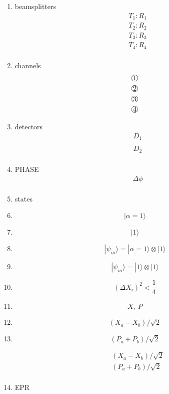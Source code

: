 \documentclass[12pt]{article}
\begin{document}
\begin{enumerate}
\item beamsplitters
\begin{align*} 
&  T_{1}:R_{1} \\
&  T_{2}:R_{2} \\
&  T_{3}:R_{3} \\
&  T_{4}:R_{4} \\
\end{align*}

\item channels
\begin{align*} 
&  \raisebox{.5pt}{\textcircled{\raisebox{-.9pt} {1}}}\\
&  \raisebox{.5pt}{\textcircled{\raisebox{-.9pt} {2}}}\\
&  \raisebox{.5pt}{\textcircled{\raisebox{-.9pt} {3}}}\\
&  \raisebox{.5pt}{\textcircled{\raisebox{-.9pt} {4}}}\\
\end{align*}


\item detectors
\begin{align*} 
&  D_{1} \\
\\
&  D_{2} \\
\end{align*}


\item PHASE
\begin{align*} 
&  \Delta \phi   \\
\end{align*}

\item states
\item $$ |\alpha = 1\rangle  $$

\item $$ |1\rangle   $$

\item $$ |\psi_{in}\rangle = |\alpha=1\rangle \otimes |1\rangle$$

\item $$ |\psi_{in}\rangle = |1\rangle \otimes |1\rangle$$

\item $$ (\Delta X_{i})^2 < \frac{1}{4} $$

\item $$ X, \ P $$

\item $$ (X_{a} - X_{b})/\sqrt{2} $$
\item $$ (P_{a} + P_{b})/\sqrt{2} $$


\begin{align*} 
&  (X_{a} - X_{b})/\sqrt{2} \\
&  (P_{a} + P_{b})/\sqrt{2} \\
\end{align*}

\item EPR






\end{enumerate}
\end{document}
